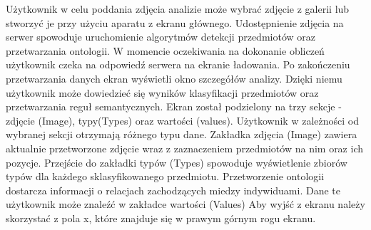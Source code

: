 {Użytkownik w celu poddania zdjęcia analizie może wybrać zdjęcie z galerii lub stworzyć je przy użyciu aparatu z ekranu głównego. Udostępnienie zdjęcia na serwer spowoduje uruchomienie algorytmów detekcji przedmiotów oraz przetwarzania ontologii. W momencie oczekiwania na dokonanie obliczeń użytkownik czeka na odpowiedź serwera na ekranie ładowania. Po zakończeniu przetwarzania danych ekran wyświetli okno szczegółów analizy. Dzięki niemu użytkownik może dowiedzieć się wyników klasyfikacji przedmiotów oraz przetwarzania reguł semantycznych. Ekran został podzielony na trzy sekcje - zdjęcie (Image), typy(Types) oraz wartości (values). Użytkownik w zależności od wybranej sekcji otrzymają różnego typu dane. Zakładka zdjęcia (Image) zawiera aktualnie przetworzone zdjęcie wraz z zaznaczeniem przedmiotów na nim oraz ich pozycje. Przejście do zakładki typów (Types) spowoduje wyświetlenie zbiorów typów dla każdego sklasyfikowanego przedmiotu. Przetworzenie ontologii dostarcza informacji o relacjach zachodzących miedzy indywiduami. Dane te użytkownik może znaleźć w zakładce wartości (Values)  Aby wyjść z ekranu należy skorzystać z pola x, które znajduje się w prawym górnym rogu ekranu.

}
